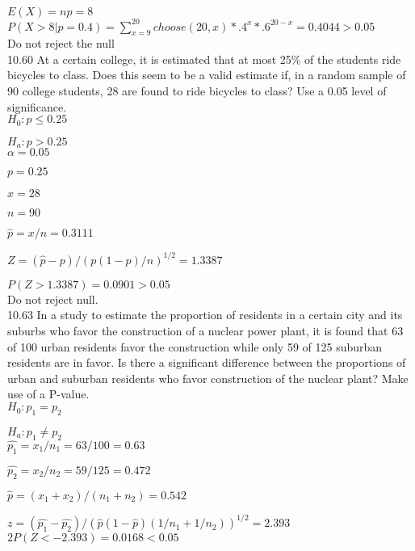 $E(X) = np = 8$ \\

$P(X > 8 | p = 0.4) = \sum^{20}_{x=9} choose(20,x)*.4^x*.6^{20-x} = 0.4044 > 0.05$ \\

Do not reject the null \\


10.60 At a certain college, it is estimated that at most 25\% of the students ride bicycles to class. Does this seem to be a valid estimate if, in a random sample of 90 college students, 28 are found to ride bicycles to class? Use a 0.05 level of significance. \\

$H_0 : p \leq 0.25 $

$H_a : p > 0.25 $ \\

$\alpha = 0.05$

$p = 0.25$ 

$x = 28$

$n = 90$

$\hat{p} = x/n = 0.3111$ 

$Z = (\hat{p} - p)/(p(1-p)/n)^{1/2} = 1.3387$

$P(Z > 1.3387) = 0.0901 > 0.05$ \\

Do not reject null. \\

10.63 In a study to estimate the proportion of residents in a certain city and its suburbs who favor the construction of a nuclear power plant, it is found that 63 of 100 urban residents favor the construction while only 59 of 125 suburban residents are in favor. Is there a significant difference between the proportions of urban and suburban residents who favor construction of the nuclear plant? Make use of a P-value. \\

$H_0 : p_1 = p_2$

$H_a : p_1 \neq p_2$ \\

$\hat{p_1} = x_1/n_1 = 63/100 = 0.63$

$\hat{p_2} = x_2/n_2 = 59/125 = 0.472$

$\hat{p} = (x_1 + x_2)/(n_1 + n_2) = $$0.542$

$z = (\hat{p_1} - \hat{p_2})/(\hat{p}(1 - \hat{p})(1/n_1 + 1/n_2))^{1/2}$$=2.393$ \\

$2P(Z < -2.393) = 0.0168 < 0.05$  \\

